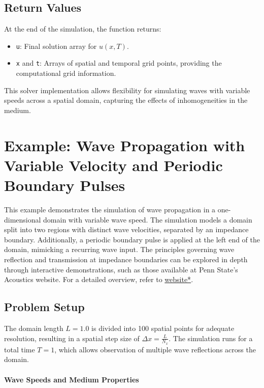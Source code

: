 \documentclass{article}
\begin{document}
		
		\subsection{Return Values}
		
		At the end of the simulation, the function returns:
		\begin{itemize}
			\item \texttt{u}: Final solution array for \( u(x, T) \).
			\item \texttt{x} and \texttt{t}: Arrays of spatial and temporal grid points, providing the computational grid information.
		\end{itemize}
		
		This solver implementation allows flexibility for simulating waves with variable speeds across a spatial domain, capturing the effects of inhomogeneities in the medium.
		
	
		
	\section{Example: Wave Propagation with Variable Velocity and Periodic Boundary Pulses}
	
		This example demonstrates the simulation of wave propagation in a one-dimensional domain with variable wave speed. The simulation models a domain split into two regions with distinct wave velocities, separated by an impedance boundary. Additionally, a periodic boundary pulse is applied at the left end of the domain, mimicking a recurring wave input. 
		The principles governing wave reflection and transmission at impedance boundaries can be explored in depth through interactive demonstrations, such as those available at Penn State’s Acoustics website. For a detailed overview, refer to \href{https://www.acs.psu.edu/drussell/demos/reflect/reflect.html}{website*}.
		
		\subsection{Problem Setup}
		
		The domain length \( L = 1.0 \) is divided into 100 spatial points for adequate resolution, resulting in a spatial step size of \( \Delta x = \frac{L}{N_x} \). The simulation runs for a total time \( T = 1 \), which allows observation of multiple wave reflections across the domain. 
		
		\paragraph{Wave Speeds and Medium Properties} 
		
\end{document}
